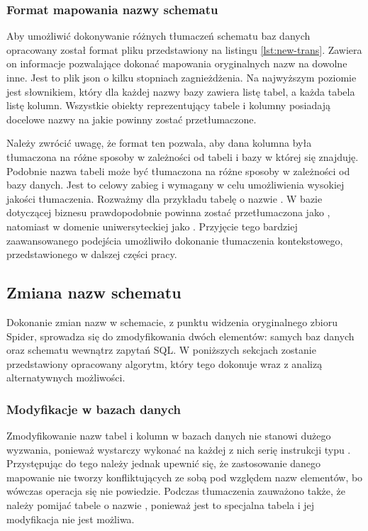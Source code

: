\subsubsection{Format mapowania nazwy schematu}
Aby umożliwić dokonywanie różnych tłumaczeń schematu baz danych opracowany został format pliku przedstawiony na listingu \ref{lst:new-trans}. Zawiera on informacje pozwalające dokonać mapowania oryginalnych nazw na dowolne inne. Jest to plik json o kilku stopniach zagnieżdżenia. Na najwyższym poziomie jest słownikiem, który dla każdej nazwy bazy zawiera listę tabel, a każda tabela listę kolumn. Wszystkie obiekty reprezentujący tabele i kolumny posiadają docelowe nazwy na jakie powinny zostać przetłumaczone.

\begin{minipage}{\linewidth}

\end{minipage}

Należy zwrócić uwagę, że format ten pozwala, aby dana kolumna była tłumaczona na różne sposoby w zależności od tabeli i bazy w której się znajduję. Podobnie nazwa tabeli może być tłumaczona na różne sposoby w zależności od bazy danych. Jest to celowy zabieg i wymagany w celu umożliwienia wysokiej jakości tłumaczenia. Rozważmy dla przykładu tabelę o nazwie . W bazie dotyczącej biznesu prawdopodobnie powinna zostać przetłumaczona jako , natomiast w domenie uniwersyteckiej jako . Przyjęcie tego bardziej zaawansowanego podejścia umożliwiło dokonanie tłumaczenia kontekstowego, przedstawionego w dalszej części pracy.

\subsection{Zmiana nazw schematu}
Dokonanie zmian nazw w schemacie, z punktu widzenia oryginalnego zbioru Spider, sprowadza się do zmodyfikowania dwóch elementów: samych baz danych oraz schematu wewnątrz zapytań SQL. W poniższych sekcjach zostanie przedstawiony opracowany algorytm, który tego dokonuje wraz z analizą alternatywnych możliwości. 


\subsubsection{Modyfikacje w bazach danych}
Zmodyfikowanie nazw tabel i kolumn w bazach danych nie stanowi dużego wyzwania, ponieważ wystarczy wykonać na każdej z nich serię instrukcji typu . Przystępując do tego należy jednak upewnić się, że zastosowanie danego mapowanie nie tworzy konfliktujących ze sobą pod względem nazw elementów, bo wówczas operacja się nie powiedzie. Podczas tłumaczenia zauważono także, że należy pomijać tabele o nazwie , ponieważ jest to specjalna tabela i jej modyfikacja nie jest możliwa.

